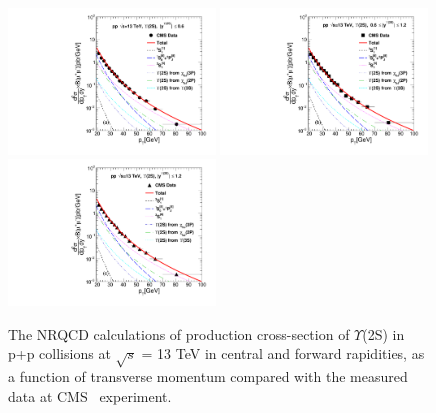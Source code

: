 \documentclass[review]{elsarticle}
\begin{document}
\begin{figure}
  \centering
  \includegraphics[width=0.49\textwidth]{Figures/NRQCD_Beauty/Fig6a_CMS_D2NDPtDy_Y2S_13TeV_Y0006_Pt.pdf}
  \includegraphics[width=0.49\textwidth]{Figures/NRQCD_Beauty/Fig6b_CMS_D2NDPtDy_Y2S_13TeV_Y0612_Pt.pdf} 
  \includegraphics[width=0.49\textwidth]{Figures/NRQCD_Beauty/Fig6c_CMS_D2NDPtDy_Y2S_13TeV_Y0012_Pt.pdf}
  \caption{\small{The NRQCD calculations of production cross-section of $\Upsilon$(2S) in p+p collisions at 
      $\sqrt{s}$ = 13 TeV in central and forward rapidities, as a function of transverse momentum compared with the measured data 
      at CMS~\cite{Sirunyan:2017qdw} experiment. }}
  \label{Fig:SigmaY2SCMS13TeV}
\end{figure}
\end{document}
